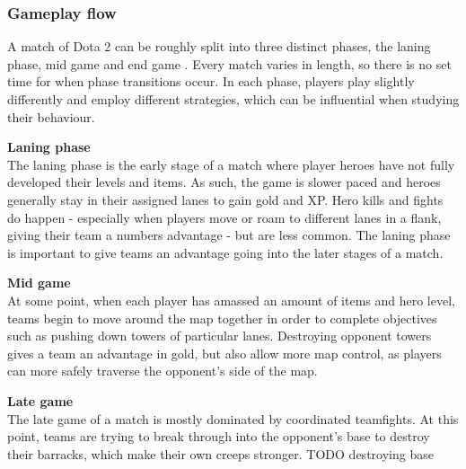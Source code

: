 \documentclass[Report.tex]{subfiles}
\begin{document}


\subsubsection{Gameplay flow}
A match of Dota 2 can be roughly split into three distinct phases, the laning phase, mid game and end game \cite{dota-phases}. Every match varies in length, so there is no set time for when phase transitions occur. In each phase, players play slightly differently and employ different strategies, which can be influential when studying their behaviour. 

\textbf{Laning phase} \\
The laning phase is the early stage of a match where player heroes have not fully developed their levels and items. As such, the game is slower paced and heroes generally stay in their assigned lanes to gain gold and XP. Hero kills and fights do happen - especially when players move or roam to different lanes in a flank, giving their team a numbers advantage - but are less common. The laning phase is important to give teams an advantage going into the later stages of a match. 

\textbf{Mid game} \\
At some point, when each player has amassed an amount of items and hero level, teams begin to move around the map together in order to complete objectives such as pushing down towers of particular lanes. Destroying opponent towers gives a team an advantage in gold, but also allow more map control, as players can more safely traverse the opponent's side of the map. 

\textbf{Late game} \\
The late game of a match is mostly dominated by coordinated teamfights. At this point, teams are trying to break through into the opponent's base to destroy their barracks, which make their own creeps stronger. TODO destroying base


\end{document}
